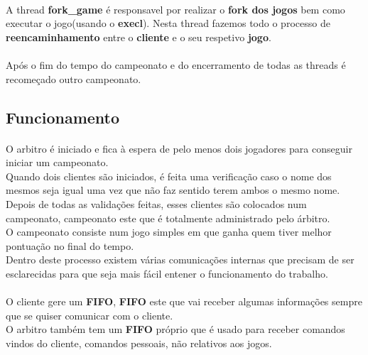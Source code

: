 \documentclass[letterpaper, 11pt]{article}
\begin{document}
\paragraph{}
A thread \textbf{fork\_game} é responsavel por realizar o \textbf{fork dos jogos} bem como executar o jogo(usando o \textbf{execl}). Nesta thread fazemos todo o processo de \textbf{reencaminhamento} entre o \textbf{cliente} e o seu respetivo \textbf{jogo}.
\paragraph{}
Após o fim do tempo do campeonato e do encerramento de todas as threads é recomeçado outro campeonato. 

\subsection{Funcionamento}
\label{sec:org3a9e2ee}

\paragraph{}
O arbitro é iniciado e fica à espera de pelo menos dois jogadores para conseguir iniciar um campeonato.\\
Quando dois clientes são iniciados, é feita uma verificação caso o nome dos mesmos seja igual uma vez que não faz sentido terem ambos o mesmo nome.\\
Depois de todas as validações feitas, esses clientes são colocados num campeonato, campeonato este que é totalmente administrado pelo árbitro.\\
O campeonato consiste num jogo simples em que ganha quem tiver melhor pontuação no final do tempo.\\
Dentro deste processo existem várias comunicações internas que precisam de ser esclarecidas para que seja mais fácil entener o funcionamento do trabalho.
\paragraph{}
O cliente gere um \textbf{FIFO}, \textbf{FIFO} este que vai receber algumas informações sempre que se quiser comunicar com o cliente.\\
O arbitro também tem um \textbf{FIFO} próprio que é usado para receber comandos vindos do cliente, comandos pessoais, não relativos aos jogos.
\end{document}
